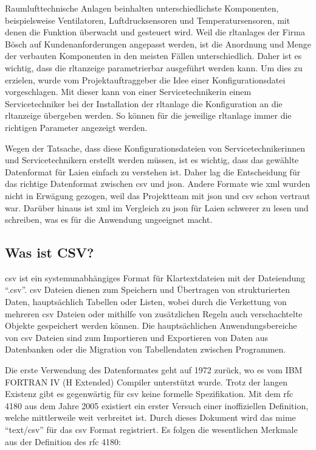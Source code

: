 Raumlufttechnische Anlagen beinhalten unterschiedlichste Komponenten, beispielsweise Ventilatoren, Luftdrucksensoren und Temperatursensoren, mit denen die Funktion überwacht und gesteuert wird. Weil die \acsp{rltanlage} der Firma Bösch auf Kundenanforderungen angepasst werden, ist die Anordnung und Menge der verbauten Komponenten in den meisten Fällen unterschiedlich. Daher ist es wichtig, dass die \acs{rltanzeige} parametrierbar ausgeführt werden kann. Um dies zu erzielen, wurde vom Projektauftraggeber die Idee einer Konfigurationsdatei vorgeschlagen. Mit dieser kann von einer  Servicetechnikerin \bzw einem Servicetechniker bei der Installation der \acs{rltanlage} die Konfiguration an die \acs{rltanzeige} übergeben werden. So können für die jeweilige \acs{rltanlage} immer die richtigen Parameter angezeigt werden.

Wegen der Tatsache, dass diese Konfigurationsdateien von Servicetechnikerinnen und Servicetechnikern erstellt werden müssen, ist es wichtig, dass das gewählte Datenformat für Laien einfach zu verstehen ist. Daher lag die Entscheidung für das richtige Datenformat zwischen \acs{csv} und \acs{json}. Andere Formate  wie \acf{xml} wurden nicht in Erwägung gezogen, weil das Projektteam mit \acs{json} und \acs{csv} schon vertraut war. Darüber hinaus ist \acs{xml} im Vergleich zu \acs{json} für Laien schwerer zu lesen und schreiben, was es für die Anwendung ungeeignet macht. 

\subsection{Was ist CSV?}\label{csv_kapitel}
\acf{csv} ist ein systemunabhängiges Format für Klartextdateien mit der Dateiendung \enquote{.csv}. \acs{csv} Dateien dienen zum Speichern und Übertragen von strukturierten Daten, hauptsächlich Tabellen oder Listen, wobei durch die Verkettung von mehreren \acs{csv} Dateien oder mithilfe von zusätzlichen Regeln auch verschachtelte Objekte gespeichert werden können. Die hauptsächlichen Anwendungsbereiche von \acs{csv} Dateien sind zum Importieren und Exportieren von Daten aus Datenbanken oder die Migration von Tabellendaten zwischen Programmen. \cite[vgl.][]{FuchsMediaSolutions:o.J.}

Die erste Verwendung des Datenformates geht auf 1972 zurück, wo es vom IBM FORTRAN IV (H Extended) Compiler unterstützt wurde. \cite[vgl.][]{IBM:1972} Trotz der langen Existenz gibt es gegenwärtig für \acs{csv} keine formelle Spezifikation. Mit dem \acs{rfc} 4180 \cite[vgl.][]{Shafranovich:2005} aus dem Jahre 2005 existiert ein erster Versuch einer inoffiziellen Definition, welche mittlerweile weit verbreitet ist. Durch dieses Dokument wird das \acf{mime} \enquote{text/csv} für das \acs{csv} Format registriert. Es folgen die wesentlichen Merkmale aus der Definition des \acs{rfc} 4180:

